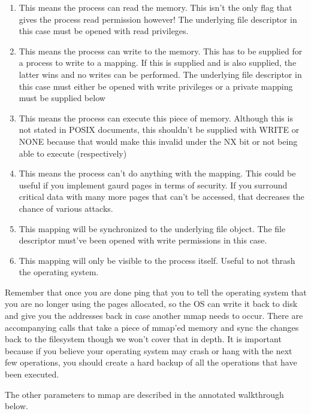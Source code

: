 \begin{enumerate}
\item {} This means the process can read the memory. This isn't the only flag that gives the process read permission however! The underlying file descriptor in this case must be opened with read privileges.
\item {} This means the process can write to the memory. This has to be supplied for a process to write to a mapping. If this is supplied and  is also supplied, the latter wins and no writes can be performed. The underlying file descriptor in this case must either be opened with write privileges or a private mapping must be supplied below
\item {} This means the process can execute this piece of memory. Although this is not stated in POSIX documents, this shouldn't be supplied with WRITE or NONE because that would make this invalid under the NX bit or not being able to execute (respectively)
\item {} This means the process can't do anything with the mapping. This could be useful if you implement gaurd pages in terms of security. If you surround critical data with many more pages that can't be accessed, that decreases the chance of various attacks.
\item {} This mapping will be synchronized to the underlying file object. The file descriptor must've been opened with write permissions in this case.
\item {} This mapping will only be visible to the process itself. Useful to not thrash the operating system.
\end{enumerate}

Remember that once you are done ping that you  to tell the operating system that you are no longer using the pages allocated, so the OS can write it back to disk and give you the addresses back in case another mmap needs to occur.
There are accompanying calls  that take a piece of mmap'ed memory and sync the changes back to the filesystem though we won't cover that in depth. It is important because if you believe your operating system may crash or hang with the next few operations, you should create a hard backup of all the operations that have been executed.

The other parameters to mmap are described in the annotated walkthrough below.

